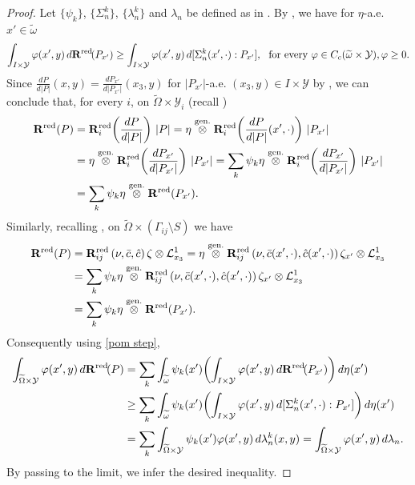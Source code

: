 \documentclass[reqno,10pt]{amsart}
\numberwithin{equation}{section}
\theoremstyle{remark}
\newcommand{\calL}{\mathcal{L}}
\newcommand{\calY}{\mathcal{Y}}
\newcommand{\genprod}{\stackrel{\text{gen.}}{\otimes}}
\newcommand{\ext}[1]{\widetilde{#1}}
\newcommand{\disspot}{\mathbf{R}}
\begin{document}
\begin{proof} 
Let $\{\psi_{k}\}$, $\{\Sigma^{k}_n\}$, $\{\lambda^{k}_n\}$ and $\lambda_n$ be defined as in . 
By , we have for $\eta$-a.e. $x' \in \ext{\omega}$
\begin{equation} \label{pom step} 
	\int_{I \times \calY} \varphi(x',y)\,d\disspot^{\rm red}\!(P_{x'}) \geq \int_{I \times \calY} \varphi(x',y) \,d[ \Sigma^{k}_n(x',\cdot) : P_{x'} ], \ \text{ for every } \varphi \in C_{c}(\ext{\omega} \times \calY), \varphi \geq 0.
\end{equation}
Since $\frac{dP}{d|P|}(x,y) = \frac{dP_{x'}}{d|P_{x'}|}(x_3,y)$ for $|P_{x'}|$-a.e. $(x_3,y) \in I \times \calY$ by \cite[Proposition 2.2]{Buzancic.Davoli.Velcic.2024.1st}, we can conclude that, for every $i$, on $\ext{\Omega} \times \calY_i$ (recall )
\begin{align*}
	\disspot^{\rm red}(P) 
	& = \disspot^{\rm red}_i\!\left(\frac{dP}{d|P|}\right)\,|P| 
	= \eta \genprod \disspot^{\rm red}_i\!\left(\frac{dP}{d|P|}(x',\cdot)\right)\,|P_{x'}| 
	\\& = \eta \genprod \disspot^{\rm red}_i\!\left(\frac{dP_{x'}}{d|P_{x'}|}\right)\,|P_{x'}|
	= \sum_{k} \psi_{k} \eta \genprod \disspot^{\rm red}_i\!\left(\frac{dP_{x'}}{d|P_{x'}|}\right)\,|P_{x'}|
	\\& = \sum_{k} \psi_{k} \eta \genprod \disspot^{\rm red}(P_{x'}).
\end{align*}
Similarly, recalling , on $\ext{\Omega} \times (\Gamma_{ij} \setminus S)$ we have
\begin{align*}
	\disspot^{\rm red}(P)
	& = \disspot_{ij}^{\rm red}\left(\nu,\bar{c},\hat{c}\right) \zeta \otimes \calL_{x_3}^1 
	= \eta \genprod \disspot_{ij}^{\rm red}\left(\nu,\bar{c}(x',\cdot),\hat{c}(x',\cdot)\right) \zeta_{x'} \otimes \calL_{x_3}^1
	\\& = \sum_{k} \psi_{k} \eta \genprod \disspot_{ij}^{\rm red}\left(\nu,\bar{c}(x',\cdot),\hat{c}(x',\cdot)\right) \zeta_{x'} \otimes \calL_{x_3}^1
	\\& = \sum_{k} \psi_{k} \eta \genprod \disspot^{\rm red}(P_{x'}).
\end{align*}
Consequently using \eqref{pom step}, 
\begin{align*}
	\int_{\ext{\Omega} \times \calY} \varphi(x',y)\,d\disspot^{\rm red}\!(P) 
	& = \sum_{k} \int_{\ext{\omega}} \psi_{k}(x') \!\left( \int_{I \times \calY} \varphi(x',y)\,d\disspot^{\rm red}\!(P_{x'}) \right)\! \,d\eta(x')
	\\& \geq \sum_{k} \int_{\ext{\omega}} \psi_{k}(x') \!\left( \int_{I \times \calY} \varphi(x',y) \,d[ \Sigma^{k}_n(x',\cdot) : P_{x'} ] \right)\! \,d\eta(x')
	\\& = \sum_{k} \int_{\ext{\Omega} \times \calY} \psi_{k}(x') \varphi(x',y) \,d\lambda^{k}_n(x,y) 
	= \int_{\ext{\Omega} \times \calY} \varphi(x',y) \,d\lambda_n.
\end{align*}
By passing to the limit, we infer the desired inequality.
\end{proof}
\end{document}
